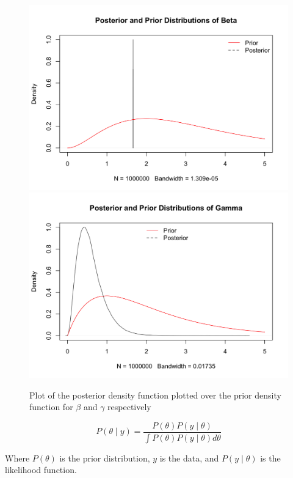 \documentclass{article}
\begin{document}
\begin{figure}[htbp]
\includegraphics[scale=.2, center]{ChainBinomBetaPosPriorPlot.png}
\includegraphics[scale=.2, center]{ChainBinomGammaPosPriorPlot.png}
\caption{Plot of the posterior density function plotted over the prior density function for $\beta$ and $\gamma$ respectively}
\label{fig:ChainBinomPosPriorPlots}
\end{figure}

\begin{equation}
P(\theta \mid y) = \frac{P(\theta)P(y \mid \theta)}{\int P(\theta)P(y \mid \theta) d\theta}
\end{equation}



Where $P(\theta)$ is the prior distribution, $y$ is the data, and $P(y \mid \theta)$ is the likelihood function. 
\end{document}

